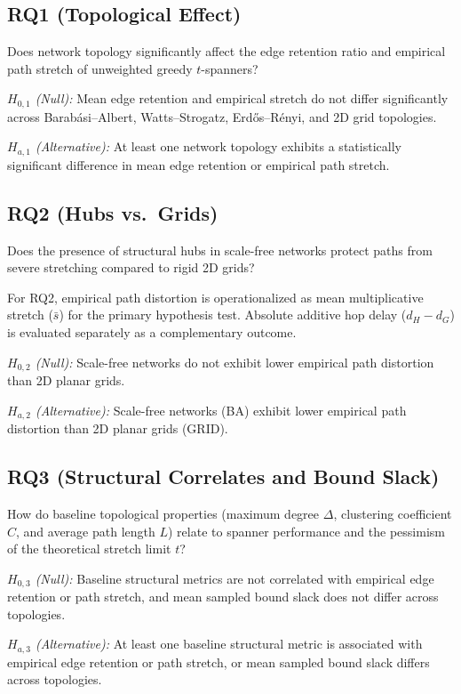 \documentclass[conference]{IEEEtran}
\begin{document}
\subsection{RQ1 (Topological Effect)}
Does network topology significantly affect the edge retention ratio and empirical path stretch of unweighted greedy $t$-spanners?

\noindent
\textit{$H_{0,1}$ (Null):}
Mean edge retention and empirical stretch do not differ significantly across Barab\'{a}si--Albert, Watts--Strogatz, Erd\H{o}s--R\'{e}nyi, and 2D grid topologies.

\noindent
\textit{$H_{a,1}$ (Alternative):}
At least one network topology exhibits a statistically significant difference in mean edge retention or empirical path stretch.

\subsection{RQ2 (Hubs vs.\ Grids)}
Does the presence of structural hubs in scale-free networks protect paths from severe stretching compared to rigid 2D grids?

For RQ2, empirical path distortion is operationalized as mean multiplicative stretch ($\bar{s}$) for the primary hypothesis test. Absolute additive hop delay ($d_H - d_G$) is evaluated separately as a complementary outcome.

\noindent
\textit{$H_{0,2}$ (Null):} Scale-free networks do not exhibit lower empirical path distortion than 2D planar grids.

\noindent
\textit{$H_{a,2}$ (Alternative):} Scale-free networks (BA) exhibit lower empirical path distortion than 2D planar grids (GRID).

\subsection{RQ3 (Structural Correlates and Bound Slack)}
How do baseline topological properties (maximum degree $\Delta$, clustering coefficient $C$, and average path length $L$) relate to spanner performance and the pessimism of the theoretical stretch limit $t$?

\noindent
\textit{$H_{0,3}$ (Null):}
Baseline structural metrics are not correlated with empirical edge retention or path stretch, and mean sampled bound slack does not differ across topologies.

\noindent
\textit{$H_{a,3}$ (Alternative):}
At least one baseline structural metric is associated with empirical edge retention or path stretch, or mean sampled bound slack differs across topologies.
\end{document}
